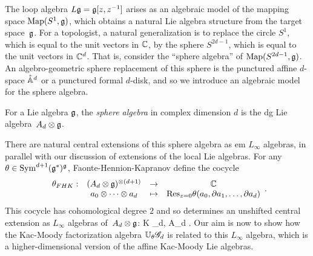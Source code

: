 The loop algebra $L\mathfrak g = \mathfrak g[z,z^{-1}]$ arises as an algebraic model of the mapping space ${\rm Map}(S^1,\mathfrak g)$,
which obtains a natural Lie algebra structure from the target space~$\mathfrak g$.
For a topologist, a natural generalization is to replace the circle $S^1$, which is equal to the unit vectors in $\mathbb C$, by the sphere $S^{2d-1}$, which is equal to the unit vectors in $\mathbb C^d$.
That is, consider the ``sphere algebra'' of ${\rm Map}(S^{2d-1},\mathfrak g)$.
An algebro-geometric sphere replacement of this sphere is the punctured affine $d$-space $\mathring{\mathbb A}^{d}$ or a punctured formal $d$-disk,
and so we introduce an algebraic model for the sphere algebra.

\begin{dfn}
For a Lie algebra $\mathfrak g$, the {\em sphere algebra} in complex dimension $d$ is the dg Lie algebra~$A_d \otimes \mathfrak g$.
\end{dfn}

There are natural central extensions of this sphere algebra as {em $L_\infty$ algebras},
in parallel with our discussion of extensions of the local Lie algebras.
For any $\theta \in {\rm Sym}^{d+1}(\mathfrak g^*)^\mathfrak g$, Faonte-Hennion-Kapranov define the cocycle
\[
\label{fhk cocycle}
\begin{array}{cccc}
\theta_{FHK} : & (A_d \otimes \mathfrak g)^{\otimes (d+1)} & \to & \mathbb C\\ 
& a_0 \otimes \cdots \otimes a_d & \mapsto & {\rm Res}_{z=0} \theta(a_0,\partial a_1,\ldots,\partial a_d)
\end{array}.
\]
This cocycle has cohomological degree $2$ and so determines an unshifted central extension as $L_\infty$ algebras of~$A_d \otimes \mathfrak g$:
\beqn\label{gdt}
\CC \cdot K \to \Hat{\fg}_{d, \theta} \to A_d \tensor \fg .
\eeqn
{}
Our aim is now to show how the Kac-Moody factorization algebra $\mathbb U_\theta \mathscr G_d$ is related to this $L_\infty$ algebra,
which is a higher-dimensional version of the affine Kac-Moody Lie algebras. 

%

